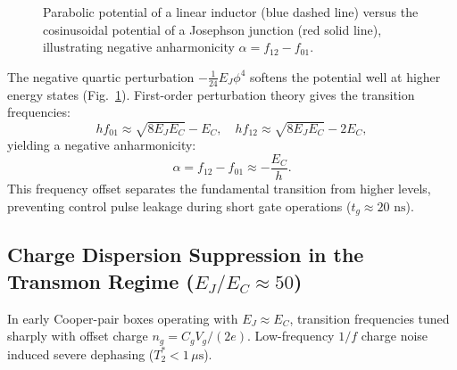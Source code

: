 \documentclass[10pt,journal,compsoc]{IEEEtran}
\begin{document}
\begin{figure}[!ht]
\centering
{}
\caption{Parabolic potential of a linear inductor (blue dashed line) versus the cosinusoidal potential of a Josephson junction (red solid line), illustrating negative anharmonicity $\alpha = f_{12} - f_{01}$.}
\label{fig:anharmonicity}
\end{figure}

The negative quartic perturbation $-\frac{1}{24}E_J\phi^4$ softens the potential well at higher energy states (Fig.~\ref{fig:anharmonicity}). First-order perturbation theory gives the transition frequencies:
\begin{equation}
h f_{01} \approx \sqrt{8 E_J E_C} - E_C, \quad h f_{12} \approx \sqrt{8 E_J E_C} - 2E_C,
\end{equation}
yielding a negative anharmonicity:
\begin{equation}
\alpha = f_{12} - f_{01} \approx -\frac{E_C}{h}.
\end{equation}
This frequency offset separates the fundamental transition from higher levels, preventing control pulse leakage during short gate operations ($t_g \approx 20\text{ ns}$).

\subsection{Charge Dispersion Suppression in the Transmon Regime (\texorpdfstring{$E_J/E_C \approx 50$}{EJ/EC approx 50})}
In early Cooper-pair boxes operating with $E_J \approx E_C$, transition frequencies tuned sharply with offset charge $n_g = C_g V_g / (2e)$. Low-frequency $1/f$ charge noise induced severe dephasing ($T_2^* < 1\,\mu\text{s}$).
\end{document}
